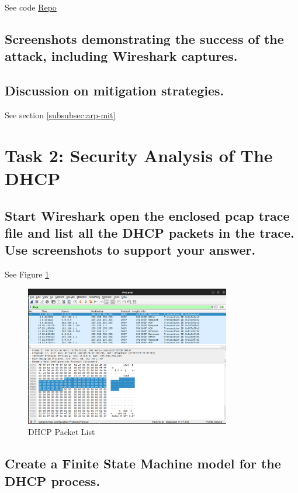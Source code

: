 \documentclass{article}
\begin{document}
See code \href{https://github.com/MattBelanger321/COMP8670/tree/master/lab3/task1}{Repo}

\subsection*{Screenshots demonstrating the success of the attack, including Wireshark captures.}

\subsection*{Discussion on mitigation strategies.}

See section \ref{subsubsec:arp-mit}

\newpage


\section{Task 2: Security Analysis of The DHCP}

\subsection{Start Wireshark open the enclosed pcap trace file and list all the DHCP packets in the trace. Use
screenshots to support your answer.}

See Figure \ref{fig:pcap_dhcp}

\begin{figure}[h]
    \centering
    \includegraphics[width=0.8\textwidth]{task2/dhcp_wireshark.png}
    \caption{DHCP Packet List}
    \label{fig:pcap_dhcp}
\end{figure}

\subsection{Create a Finite State Machine model for the DHCP process.}
 
\end{document}
